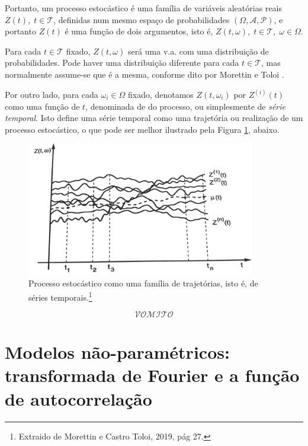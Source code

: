 Portanto, um processo estocástico é uma família de variáveis aleatórias reais $Z(t),\; t \in \mathcal{T}$, definidas num mesmo espaço de probabilidades $(\Omega, \mathcal{A}, \mathcal{P})$, e portanto $Z(t)$ é uma função de dois argumentos, isto é, $Z(t, \omega),\; t \in \mathcal{T},\; \omega \in \Omega$.

Para cada $t \in \mathcal{T}$ fixado, $Z(t, \omega)$ será uma v.a. com uma distribuição de probabilidades. Pode haver uma distribuição diferente para cada $t \in \mathcal{T}$, mas normalmente assume-se que é a mesma, conforme dito por Morettin e Toloi \citep{morettin}.

Por outro lado, para cada $\omega_i \in \Omega$ fixado, denotamos $Z(t, \omega_i)$ por $Z^{(i)}(t)$ como uma função de $t$, denominada de  do processo, ou simplesmente de \emph{série temporal}. Isto define uma série temporal como uma trajetória ou realização de um processo estocástico, o que pode ser melhor ilustrado pela Figura \ref{fig:trajetorias}, abaixo.

\begin{figure}[htb]
\centering
\includegraphics[width=10cm]{figuras/trajetorias}
\caption{Processo estocástico como uma família de trajetórias, isto é, de séries temporais.\footnote{Extraido de Morettin e Castro Toloi, 2019, pág 27.}}
\label{fig:trajetorias}
\end{figure}

\[ \mathcal{VOMITO} \]

\section{Modelos não-paramétricos: transformada de Fourier e a função de autocorrelação}

